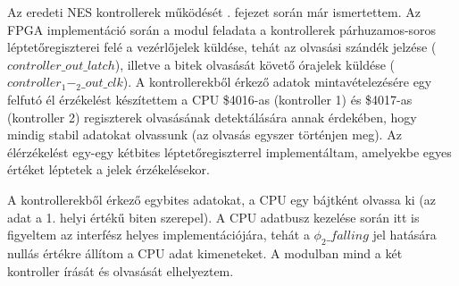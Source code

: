 Az eredeti NES kontrollerek működését . fejezet során már ismertettem. Az FPGA implementáció során a modul feladata a kontrollerek párhuzamos-soros léptetőregiszterei felé a vezérlőjelek küldése, tehát az olvasási szándék jelzése ($controller\_out\_latch$), illetve a bitek olvasását követő órajelek küldése ($controller_1-_2\_out\_clk$). A kontrollerekből érkező adatok mintavételezésére egy felfutó él érzékelést készítettem a CPU \$4016-as (kontroller 1) és \$4017-as (kontroller 2) regiszterek olvasásának detektálására annak érdekében, hogy mindig stabil adatokat olvassunk (az olvasás egyszer történjen meg). Az élérzékelést egy-egy kétbites léptetőregiszterrel implementáltam, amelyekbe egyes értéket léptetek a jelek érzékelésekor.   

A kontrollerekből érkező egybites adatokat, a CPU egy bájtként olvassa ki (az adat a 1. helyi értékű %
biten szerepel). A CPU adatbusz kezelése során itt is figyeltem az interfész helyes implementációjára, tehát a $\phi_2\_falling$ jel hatására nullás értékre állítom a CPU adat kimeneteket. A modulban mind a két kontroller írását és olvasását elhelyeztem.
